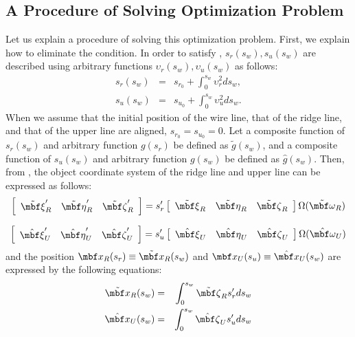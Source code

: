 \documentclass[E]{scitrans}
\begin{document}
\subsection*{A Procedure of Solving Optimization Problem}
Let us explain a procedure of solving this optimization problem. First, we explain how to eliminate the condition. In order to satisfy , $ s_r (s_w),s_u (s_w) $ are described using arbitrary functions $ \upsilon_r(s_w),\upsilon_u(s_w) $ as follows:
\begin{eqnarray}
s_r(s_w) &=& s_{r_0} + \int_{0}^{s_w} \upsilon_r^2 ds_w, \\
s_u(s_w) &=& s_{u_0} + \int_{0}^{s_w} \upsilon_u^2 ds_w. 
\end{eqnarray}
When we assume that the initial position of the wire line, that of the ridge line, and that of the upper line are aligned, $ s_{r_0}=s_{u_0}=0 $. Let a composite function of $ s_r(s_w) $ and arbitrary function $ g(s_r) $ be defined as $ \tilde{g}(s_w) $, and a composite function of $ s_u (s_w ) $ and arbitrary function $ g(s_w) $ be defined as $ \hat{g}(s_w) $. Then, from , the object coordinate system of the ridge line and upper line can be expressed as follows:
\begin{equation}\label{eq:tildeobj}
\left[\begin{array}{ccc} \tilde{\xivec}_R' & \tilde{\etavec}_R' & \tilde{\zetavec}_R' \end{array}\right] = s_r' \left[\begin{array}{ccc} \tilde{\xivec}_R & \tilde{\etavec}_R & \tilde{\zetavec}_R \end{array} \right] \Omega(\tilde{\mbold{\omega}}_R)
\end{equation}

\begin{equation}\label{eq:hatobj}
\left[\begin{array}{ccc} \hat{\xivec}_U' & \hat{\etavec}_U' & \hat{\zetavec}_U' \end{array}\right] = s_u' \left[\begin{array}{ccc} \hat{\xivec}_U & \hat{\etavec}_U & \hat{\zetavec}_U \end{array} \right] \Omega(\hat{\mbold{\omega}}_U)
\end{equation}
and the position $ \mbold{x}_R(s_r) \equiv \tilde{\mbold{x}}_R(s_w) $ and $ \mbold{x}_U(s_u) \equiv \hat{\mbold{x}}_U(s_w) $ are expressed by the following equations:
\begin{eqnarray}
\tilde{\mbold{x}}_R(s_w) &=& \int_{0}^{s_w} \tilde{\zetavec}_R s_r' ds_w \\
\hat{\mbold{x}}_U(s_w) &=& \int_{0}^{s_w} \hat{\zetavec}_U s_u' ds_w
\end{eqnarray}
\end{document}
